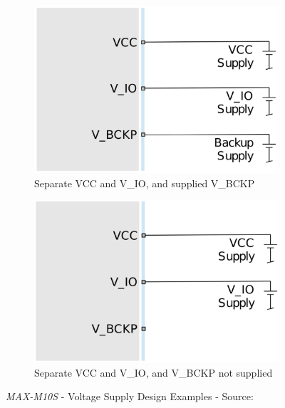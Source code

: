 \documentclass[report.tex]{subfiles}
\begin{document}
\begin{enumerate}
\begin{figure}[H]
\begin{subfigure}{0.43\textwidth}
\end{subfigure}\\[10pt]
\begin{subfigure}{0.45\textwidth}
\centering
	\includegraphics[width=1\textwidth]{Include/Figure/comp/maxm10s_volt_supp_ex3.png}
	\caption{\centering Separate VCC and V\_IO, and supplied V\_BCKP}
\end{subfigure} \hfill
\begin{subfigure}{0.45\textwidth}
\centering
	\includegraphics[width=1\textwidth]{Include/Figure/comp/maxm10s_volt_supp_ex4.png}
	\caption{\centering Separate VCC and V\_IO, and V\_BCKP not supplied}
\end{subfigure}
\caption{\textit{MAX-M10S} - Voltage Supply Design Examples - Source: \cite{MAXM10S}}
\label{fig:maxm10s_volt_supp_ex}
\end{figure}
\end{enumerate}
\end{document}
